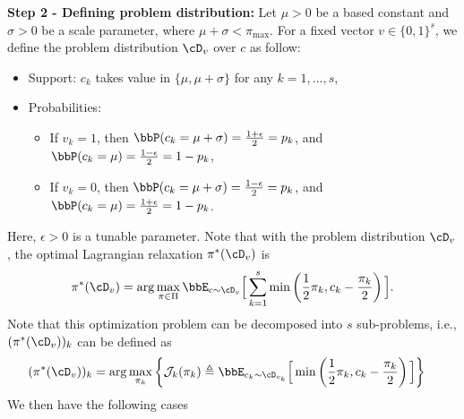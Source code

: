     \textbf{Step 2 - Defining problem distribution:} Let $\mu > 0$ be a based constant and $\sigma > 0$ be a scale parameter, where $\mu+\sigma < \pi_{\max}$. For a fixed vector $v \in \{0, 1\}^s$, we define the problem distribution $\cD_v$ over $c$ as follow:
    \begin{itemize}
        \item Support: $c_k$ takes value in $\{\mu, \mu + \sigma\}$ for any $k = 1, \dots, s$,
        \item Probabilities: 
        \begin{itemize}
            \item If $v_k = 1$, then $\bbP(c_k = \mu + \sigma) = \frac{1 + \epsilon}{2} = p_k$, and $\bbP(c_k = \mu) = \frac{1 - \epsilon}{2} = 1 - p_k$, 
            \item If $v_k = 0$, then $\bbP(c_k = \mu + \sigma) = \frac{1 - \epsilon}{2} = p_k$, and $\bbP(c_k = \mu) = \frac{1 + \epsilon}{2} = 1 - p_k$.
        \end{itemize}
    \end{itemize}
    Here, $\epsilon > 0$ is a tunable parameter. Note that with the problem distribution $\cD_v$, the optimal Lagrangian relaxation $\pi^*(\cD_v)$ is
    \begin{equation*}
        \begin{aligned}
            \pi^*(\cD_v) = \arg \max_{\pi \in \Pi} \bbE_{c \sim \cD_v} \Big[\sum_{k = 1}^s \min\left(\frac{1}{2}\pi_k, c_k - \frac{\pi_k}{2}\right) \Big].
        \end{aligned}
    \end{equation*}
    Note that this optimization problem can be decomposed into $s$ sub-problems, i.e., $(\pi^*(\cD_v))_k$ can be defined as
    \begin{equation*}
        \begin{aligned}
            (\pi^*(\cD_v))_k &= \arg \max_{\pi_k} \left\{ \mathcal J_k(\pi_k) \triangleq \bbE_{c_k \sim \cD_{v_k}} \Big[ \min\left(\frac{1}{2}\pi_k, c_k - \frac{\pi_k}{2}\right)\Big] \right\}
        \end{aligned}
    \end{equation*}
    We then have the following cases
